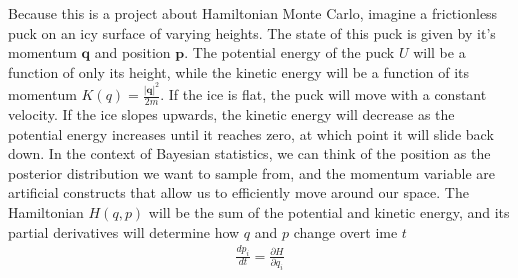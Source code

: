Because this is a project about Hamiltonian Monte Carlo, imagine a frictionless puck on an icy surface of varying heights. The state of this puck is given by it's momentum $\bm{q}$ and position $\bm{p}$. The potential energy of the puck $U$ will be a function of only its height, while the kinetic energy will be a function of its momentum $K(q)=\frac{|\bm{q}|^2}{2m}$. If the ice is flat, the puck will move with a constant velocity. If the ice slopes upwards, the kinetic energy will decrease as the potential energy increases until it reaches zero, at which point it will slide back down. In the context of Bayesian statistics, we can think of the position as the posterior distribution we want to sample from, and the momentum variable are artificial constructs that allow us to efficiently move around our space. The Hamiltonian $H(q, p)$ will be the sum of the potential and kinetic energy, and its partial derivatives will determine how $q$ and $p$ change overt ime $t$
\begin{equation*}
	\begin{split}
	\frac{d p_i}{d t}=\frac{\partial H}{\partial q_i}\\
	\
	\end{split}
\end{equation*}
